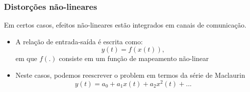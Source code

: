 \documentclass[10pt,hyperref={pdfpagemode=FullScreen},aspectratio=169]{beamer}
\begin{document}
\begin{frame}
  \frametitle{Distorções não-lineares}

  Em certos casos, efeitos não-lineares estão integrados em canais de comunicação.

  \begin{itemize}
    \item A relação de entrada-saída é escrita como:
    $$
    y(t) = f(x(t)),
    $$ 
    em que $f(.)$ consiste em um função de mapeamento não-linear
    
    \item  Neste casos, podemos reescrever o problem em termos da série de Maclaurin
    $$
    y(t) = a_0 + a_1x(t)+ a_2x^2(t) + ...
    $$
  \end{itemize}


\end{frame}
\end{document}
